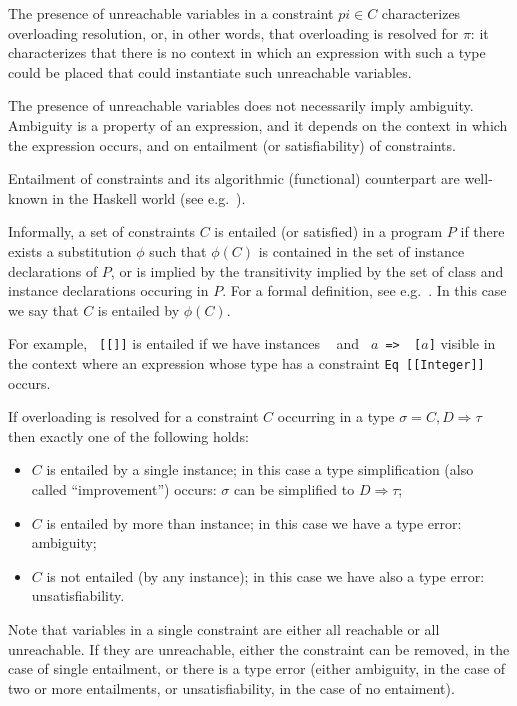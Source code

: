 The presence of unreachable variables in a constraint $pi\in C$
characterizes overloading resolution, or, in other words, that
overloading is resolved for $\pi$: it characterizes that there is no
context in which an expression with such a type could be placed that
could instantiate such unreachable variables.

The presence of unreachable variables does not necessarily imply
ambiguity. Ambiguity is a property of an expression, and it depends on
the context in which the expression occurs, and on entailment (or
satisfiability) of constraints.

Entailment of constraints and its algorithmic (functional) counterpart
are well-known in the Haskell world (see
e.g.~\cite{MarkJones94a,TheoryOfOverloading,JBCS-Ambiguity-and-constrained-polymorphism}).

Informally, a set of constraints $C$ is entailed (or satisfied) in a
program $P$ if there exists a substitution $\phi$ such that $\phi(C)$
is contained in the set of instance declarations of $P$, or is implied
by the transitivity implied by the set of class and instance
declarations occuring in $P$. For a formal definition, see
e.g.~\cite{MarkJones94a,JBCS-Ambiguity-and-constrained-polymorphism}. In
this case we say that $C$ is entailed by $\phi(C)$. 

For example, {\tt \Eq\ [[\Integer]]} is entailed if we have instances
{\tt \Eq\ \Integer} and {\tt \Eq\ $a$ => \Eq\ [$a$]} visible in the
context where an expression whose type has a constraint {\tt Eq
  [[Integer]]} occurs.

If overloading is resolved for a constraint $C$ occurring in a type
$\sigma = C,D \Rightarrow \tau$ then exactly one of the following
holds:
\begin{itemize}

\item $C$ is entailed by a single instance; in this case a type
  simplification (also called ``improvement'') occurs: $\sigma$ can be
  simplified to $D \Rightarrow \tau$;

\item $C$ is entailed by more than instance; in this case we have a
  type error: ambiguity; 

\item $C$ is not entailed (by any instance); in this case we have also
  a type error: unsatisfiability.

\end{itemize}

Note that variables in a single constraint are either all reachable or
all unreachable. If they are unreachable, either the constraint can be
removed, in the case of single entailment, or there is a type error
(either ambiguity, in the case of two or more entailments, or
unsatisfiability, in the case of no entaiment).

